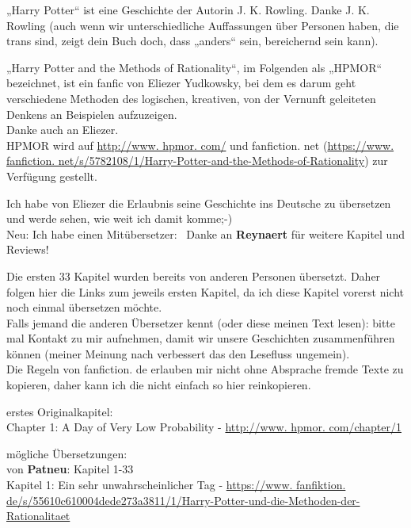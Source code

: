 

\hypertarget{vorwort-der-uxfcbersetzerin}{%

„Harry Potter“ ist eine Geschichte der Autorin J. K. Rowling. Danke J. K. Rowling (auch wenn wir unterschiedliche Auffassungen über Personen haben, die trans sind, zeigt dein Buch doch, dass „anders“ sein, bereichernd sein kann).

„Harry Potter and the Methods of Rationality“, im Folgenden als „HPMOR“ bezeichnet, ist ein fanfic von Eliezer Yudkowsky, bei dem es darum geht verschiedene Methoden des logischen, kreativen, von der Vernunft geleiteten Denkens an Beispielen aufzuzeigen.\\ Danke auch an Eliezer.\\ HPMOR wird auf \href{http://www.\%20hpmor.\%20com/“\%20target=}{http://www. hpmor. com/} und fanfiction. net (\href{https://www.\%20fanfiction.\%20net/s/5782108/1/Harry-Potter-and-the-Methods-of-Rationality“\%20target=}{https://www. fanfiction. net/s/5782108/1/Harry-Potter-and-the-Methods-of-Rationality}) zur Verfügung gestellt.

Ich habe von Eliezer die Erlaubnis seine Geschichte ins Deutsche zu übersetzen und werde sehen, wie weit ich damit komme;-)\\ Neu: Ich habe einen Mitübersetzer: ~Danke an \textbf{Reynaert} für weitere Kapitel und Reviews!

Die ersten 33 Kapitel wurden bereits von anderen Personen übersetzt. Daher folgen hier die Links zum jeweils ersten Kapitel, da ich diese Kapitel vorerst nicht noch einmal übersetzen möchte.\\ Falls jemand die anderen Übersetzer kennt (oder diese meinen Text lesen): bitte mal Kontakt zu mir aufnehmen, damit wir unsere Geschichten zusammenführen können (meiner Meinung nach verbessert das den Lesefluss ungemein).\\ Die Regeln von fanfiction. de erlauben mir nicht ohne Absprache fremde Texte zu kopieren, daher kann ich die nicht einfach so hier reinkopieren.

erstes Originalkapitel:\\ Chapter 1: A Day of Very Low Probability - \href{http://www.\%20hpmor.\%20com/chapter/1“\%20target=}{http://www. hpmor. com/chapter/1}

mögliche Übersetzungen:\\ von \textbf{Patneu}: Kapitel 1-33\\ Kapitel 1: Ein sehr unwahrscheinlicher Tag - \href{https://www.\%20fanfiktion.\%20de/s/55610c610004dede273a3811/1/Harry-Potter-und-die-Methoden-der-Rationalitaet“\%20target=}{https://www. fanfiktion. de/s/55610c610004dede273a3811/1/Harry-Potter-und-die-Methoden-der-Rationalitaet}

}
